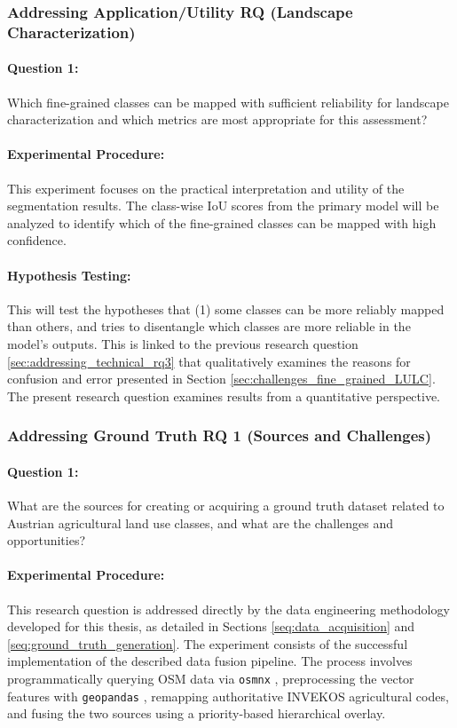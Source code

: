\documentclass{report}
\begin{document}
\subsubsection{Addressing Application/Utility RQ (Landscape Characterization)}
\label{sec:addressing_app_rq}
\paragraph{Question 1:} Which fine-grained classes can be mapped with sufficient reliability for landscape characterization and which metrics are most appropriate for this assessment?
\paragraph{Experimental Procedure:} This experiment focuses on the practical interpretation and utility of the segmentation results. The class-wise IoU scores from the primary model will be analyzed to identify which of the fine-grained classes can be mapped with high confidence.
\paragraph{Hypothesis Testing:} This will test the hypotheses that (1) some classes can be more reliably mapped than others, and tries to disentangle which classes are more reliable in the model's outputs. This is linked to the previous research question \ref{sec:addressing_technical_rq3} that qualitatively examines the reasons for confusion and error presented in Section \ref{sec:challenges_fine_grained_LULC}. The present research question examines results from a quantitative perspective.

\subsubsection{Addressing Ground Truth RQ 1 (Sources and Challenges)}
\label{sec:addressing_gt_rq1}
\paragraph{Question 1:} What are the sources for creating or acquiring a ground truth dataset related to Austrian agricultural land use classes, and what are the challenges and opportunities?
\paragraph{Experimental Procedure:} This research question is addressed directly by the data engineering methodology developed for this thesis, as detailed in Sections \ref{seq:data_acquisition} and \ref{seq:ground_truth_generation}. The experiment consists of the successful implementation of the described data fusion pipeline. The process involves programmatically querying OSM data via \texttt{osmnx} \parencite{BoeingModelingAnalyzingUrbanNetworksAmenitiesOSMnx2025}, preprocessing the vector features with \texttt{geopandas} \parencite{JordahlEtAlgeopandasgeopandasv0812020}, remapping authoritative INVEKOS agricultural codes, and fusing the two sources using a priority-based hierarchical overlay.
\end{document}

